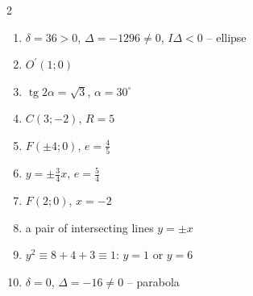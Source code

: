 \begin{multicols}{2}\raggedright
\begin{enumerate}[label=\arabic*., leftmargin=*, itemsep=1pt]
\item $\delta=36>0$, $\Delta=-1296\ne0$, $I\Delta<0$ – ellipse
\item $O^{\prime}(1;0)$
\item $\operatorname{tg}2\alpha=\sqrt3$, $\alpha=30^\circ$
\item $C(3;-2)$, $R=5$
\item $F(\pm4;0)$, $e=\frac45$
\item $y=\pm\frac34x$, $e=\frac54$
\item $F(2;0)$, $x=-2$
\item a pair of intersecting lines $y=\pm x$
\item $y^2\equiv 8+4+3\equiv1$: $y=1$ or $y=6$
\item $\delta=0$, $\Delta=-16\ne0$ – parabola
\end{enumerate}
\end{multicols}
